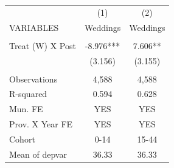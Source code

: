 \begin{tabular}{lcc} \hline
 & (1) & (2) \\
VARIABLES & Weddings & Weddings \\ \hline
 &  &  \\
Treat (W) X Post & -8.976*** & 7.606** \\
 & (3.156) & (3.155) \\
 &  &  \\
Observations & 4,588 & 4,588 \\
R-squared & 0.594 & 0.628 \\
Mun. FE & YES & YES \\
Prov. X Year FE & YES & YES \\
Cohort & 0-14 & 15-44 \\
 Mean of depvar & 36.33 & 36.33 \\ \hline
\end{tabular}
